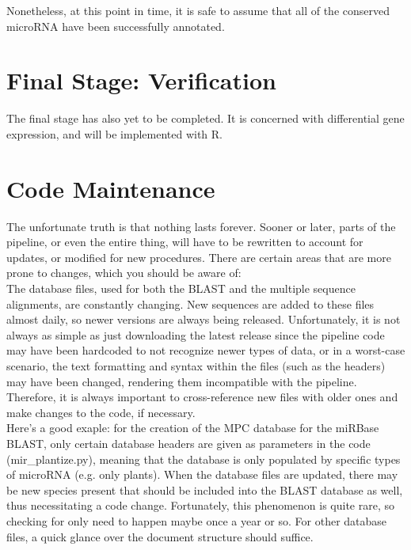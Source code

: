\documentclass[12pt,titlepage]{article}
\begin{document}
\noindent Nonetheless, at this point in time, it is safe to assume that all of the conserved microRNA have been successfully annotated.

\section{Final Stage: Verification}

The final stage has also yet to be completed. It is concerned with differential gene expression, and will be implemented with R. 

\section*{Code Maintenance}

The unfortunate truth is that nothing lasts forever. Sooner or later, parts of the pipeline, or even the entire thing, will have to be rewritten to account for updates, or modified for new procedures. There are certain areas that are more prone to changes, which you should be aware of: \\

The database files, used for both the BLAST and the multiple sequence alignments, are constantly changing. New sequences are added to these files almost daily, so newer versions are always being released. Unfortunately, it is not always as simple as just downloading the latest release since the pipeline code may have been hardcoded to not recognize newer types of data, or in a worst-case scenario, the text formatting and syntax within the files (such as the headers) may have been changed, rendering them incompatible with the pipeline. Therefore, it is always important to cross-reference new files with older ones and make changes to the code, if necessary. \\ 

Here's a good exaple: for the creation of the MPC database for the miRBase BLAST, only certain database headers are given as parameters in the code (mir\_plantize.py), meaning that the database is only populated by specific types of microRNA (e.g. only plants). When the database files are updated, there may be new species present that should be included into the BLAST database as well, thus necessitating a code change. Fortunately, this phenomenon is quite rare, so checking for only need to happen maybe once a year or so. For other database files, a quick glance over the document structure should suffice. \\
\end{document}
